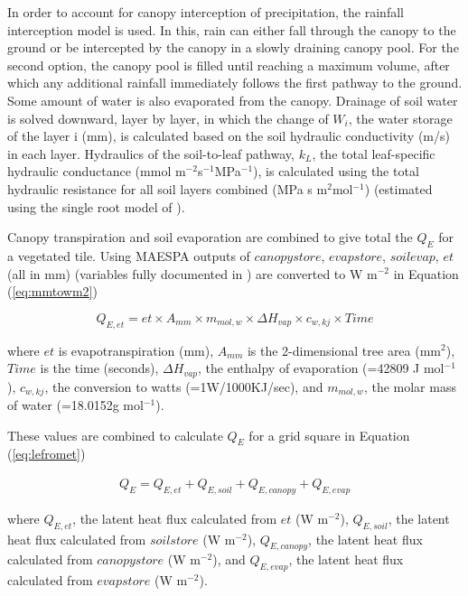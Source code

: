 \documentclass[final,3p,times,authoryear]{elsarticle}
\begin{document}
In order to account for canopy interception of precipitation, the \cite{Rutter1975} rainfall interception model is used. In this, rain can either fall through the canopy to the ground or be intercepted by the canopy in a slowly draining canopy pool. For the second option, the canopy pool is filled until reaching a maximum volume, after which any additional rainfall immediately follows the first pathway to the ground. Some amount of water is also evaporated from the canopy. Drainage of soil water is solved downward, layer by layer, in which the change of $W_{i}$, the water storage of the layer i (mm), is calculated based on the soil hydraulic conductivity (m/s) in each layer. Hydraulics of the soil-to-leaf pathway, $k_{L}$, the total leaf-specific hydraulic conductance (mmol m$^{-2}$s$^{-1}$MPa$^{-1}$), is calculated using the total hydraulic resistance for all soil layers combined (MPa s m$^{2}$mol$^{-1}$) (estimated using the single root model of \cite{Gardner1960}).

Canopy transpiration and soil evaporation are combined to give total the $Q_{E}$ for a vegetated tile. Using MAESPA outputs of $canopystore$, $evapstore$, $soilevap$, $et$ (all in mm) (variables fully documented in \cite{Duursma2016}) are converted to W m$^{-2}$ in Equation (\ref{eq:mmtowm2})


\begin{equation}\label{eq:mmtowm2} 
  Q_{E,et} = et \times A _{mm} \times m_{mol,w} \times \Delta H_{vap} \times c_{w,kj} \times Time  
\end{equation} 
 
where $et$ is evapotranspiration (mm), $A _{mm}$ is the 2-dimensional tree area (mm$^{2}$), $Time$ is the time (seconds), $\Delta H_{vap}$, the enthalpy of evaporation (=42809 J mol$^{-1}$), $c_{w,kj}$, the conversion to watts (=1W/1000KJ/sec), and $m_{mol,w}$, the molar mass of water (=18.0152g mol$^{-1}$).

These values are combined to calculate $Q_{E}$ for a grid square in Equation (\ref{eq:lefromet})


\begin{equation}\label{eq:lefromet} 
\begin{aligned}
Q_{E} = Q_{E,et} + Q_{E,soil} + Q_{E,canopy} + Q_{E,evap} 
\end{aligned}
\end{equation}

where $Q_{E,et}$, the latent heat flux calculated from $et$ (W m$^{-2}$), $Q_{E,soil}$, the latent heat flux calculated from $soilstore$ (W m$^{-2}$), $Q_{E,canopy}$, the latent heat flux calculated from $canopystore$ (W m$^{-2}$), and $Q_{E,evap}$, the latent heat flux calculated from $evapstore$ (W m$^{-2}$).
\end{document}
